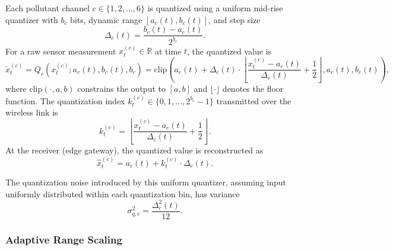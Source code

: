 Each pollutant channel $c \in \{1, 2, \ldots, 6\}$ is quantized using a uniform mid-rise quantizer with $b_c$ bits, dynamic range $[a_c(t), b_c(t)]$, and step size
\begin{equation}
\Delta_c(t) = \frac{b_c(t) - a_c(t)}{2^{b_c}}.
\label{eq:step_size}
\end{equation}
For a raw sensor measurement $x_t^{(c)} \in \mathbb{R}$ at time $t$, the quantized value is
\begin{equation}
\tilde{x}_t^{(c)} = Q_c(x_t^{(c)}; a_c(t), b_c(t), b_c) = \text{clip}\left( a_c(t) + \Delta_c(t) \cdot \left\lfloor \frac{x_t^{(c)} - a_c(t)}{\Delta_c(t)} + \frac{1}{2} \right\rfloor, a_c(t), b_c(t) \right),
\label{eq:quantization}
\end{equation}
where $\text{clip}(\cdot, a, b)$ constrains the output to $[a, b]$ and $\lfloor \cdot \rfloor$ denotes the floor function. The quantization index $k_t^{(c)} \in \{0, 1, \ldots, 2^{b_c}-1\}$ transmitted over the wireless link is
\begin{equation}
k_t^{(c)} = \left\lfloor \frac{x_t^{(c)} - a_c(t)}{\Delta_c(t)} + \frac{1}{2} \right\rfloor.
\label{eq:quantization_index}
\end{equation}
At the receiver (edge gateway), the quantized value is reconstructed as
\begin{equation}
\hat{x}_t^{(c)} = a_c(t) + k_t^{(c)} \cdot \Delta_c(t).
\label{eq:reconstruction}
\end{equation}

The quantization noise introduced by this uniform quantizer, assuming input uniformly distributed within each quantization bin, has variance \cite{gray1998quantization}
\begin{equation}
\sigma_{q,c}^2 = \frac{\Delta_c^2(t)}{12}.
\label{eq:quantization_noise}
\end{equation}

\subsubsection{Adaptive Range Scaling}

